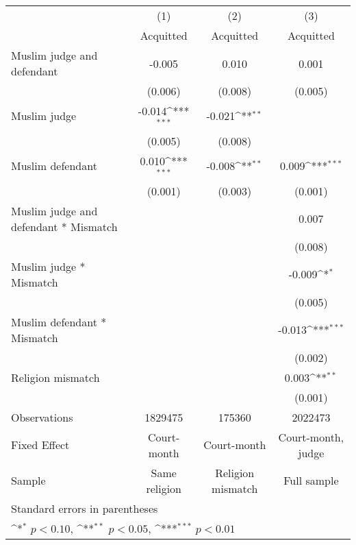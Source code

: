 {
\def\sym#1{\ifmmode^{#1}\else\(^{#1}\)\fi}
\begin{tabular}{l*{3}{c}}
\hline\hline
                    &\multicolumn{1}{c}{(1)}&\multicolumn{1}{c}{(2)}&\multicolumn{1}{c}{(3)}\\
                    &\multicolumn{1}{c}{Acquitted}&\multicolumn{1}{c}{Acquitted}&\multicolumn{1}{c}{Acquitted}\\
\hline
Muslim judge and defendant&      -0.005         &       0.010         &       0.001         \\
                    &     (0.006)         &     (0.008)         &     (0.005)         \\
[1em]
Muslim judge        &      -0.014\sym{***}&      -0.021\sym{**} &                     \\
                    &     (0.005)         &     (0.008)         &                     \\
[1em]
Muslim defendant    &       0.010\sym{***}&      -0.008\sym{**} &       0.009\sym{***}\\
                    &     (0.001)         &     (0.003)         &     (0.001)         \\
[1em]
Muslim judge and defendant * Mismatch&                     &                     &       0.007         \\
                    &                     &                     &     (0.008)         \\
[1em]
Muslim judge * Mismatch&                     &                     &      -0.009\sym{*}  \\
                    &                     &                     &     (0.005)         \\
[1em]
Muslim defendant * Mismatch&                     &                     &      -0.013\sym{***}\\
                    &                     &                     &     (0.002)         \\
[1em]
Religion mismatch   &                     &                     &       0.003\sym{**} \\
                    &                     &                     &     (0.001)         \\
\hline
Observations        &     1829475         &      175360         &     2022473         \\
Fixed Effect        & Court-month         & Court-month         &Court-month, judge         \\
Sample              &Same religion         &Religion mismatch         & Full sample         \\
\hline\hline
\multicolumn{4}{l}{\footnotesize Standard errors in parentheses}\\
\multicolumn{4}{l}{\footnotesize \sym{*} \(p<0.10\), \sym{**} \(p<0.05\), \sym{***} \(p<0.01\)}\\
\end{tabular}
}
